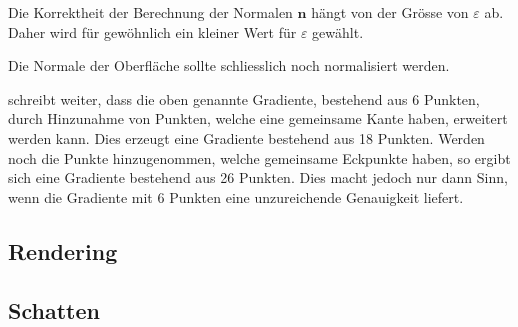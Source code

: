 Die Korrektheit der Berechnung der Normalen $\bm{n}$ hängt von der
Grösse von $\varepsilon$ ab. Daher wird für gewöhnlich ein kleiner Wert
für $\varepsilon$ gewählt.

Die Normale der Oberfläche sollte schliesslich noch normalisiert werden.

\cite{hart_ray_1989} schreibt weiter, dass die oben genannte Gradiente,
bestehend aus 6 Punkten, durch Hinzunahme von Punkten, welche eine
gemeinsame Kante haben, erweitert werden kann. Dies erzeugt eine
Gradiente bestehend aus 18 Punkten. Werden noch die Punkte
hinzugenommen, welche gemeinsame Eckpunkte haben, so ergibt sich eine
Gradiente bestehend aus 26 Punkten.
Dies macht jedoch nur dann Sinn, wenn die Gradiente mit 6 Punkten eine
unzureichende Genauigkeit liefert.

\subsection{Rendering}
\label{sec:rendering_implicit_surfaces_Rendering}

\subsection{Schatten}
\label{sec:rendering_implicit_surfaces_shadows}
